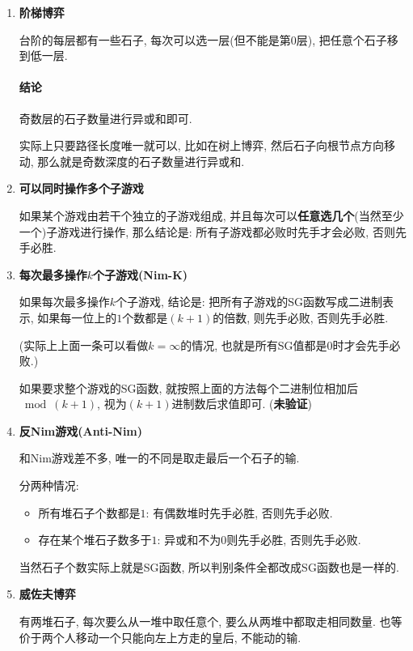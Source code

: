 \begin{enumerate}

\item \textbf{阶梯博弈}

台阶的每层都有一些石子, 每次可以选一层(但不能是第$0$层), 把任意个石子移到低一层.

\paragraph{结论}奇数层的石子数量进行异或和即可.

实际上只要路径长度唯一就可以, 比如在树上博弈, 然后石子向根节点方向移动, 那么就是奇数深度的石子数量进行异或和.

\item \textbf{可以同时操作多个子游戏}

如果某个游戏由若干个独立的子游戏组成, 并且每次可以\textbf{任意选几个}(当然至少一个)子游戏进行操作, 那么结论是: 所有子游戏都必败时先手才会必败, 否则先手必胜.

\item \textbf{每次最多操作$k$个子游戏(Nim-K)}

如果每次最多操作$k$个子游戏, 结论是: 把所有子游戏的SG函数写成二进制表示, 如果每一位上的$1$个数都是$(k+1)$的倍数, 则先手必败, 否则先手必胜.

(实际上上面一条可以看做$k=\infty$的情况, 也就是所有SG值都是$0$时才会先手必败.)

如果要求整个游戏的SG函数, 就按照上面的方法每个二进制位相加后$\bmod (k+1)$, 视为$(k+1)$进制数后求值即可. (\textbf{未验证})

\item \textbf{反Nim游戏(Anti-Nim)}

和Nim游戏差不多, 唯一的不同是取走最后一个石子的输.

分两种情况:

\begin{itemize}
	\item 所有堆石子个数都是$1$: 有偶数堆时先手必胜, 否则先手必败.
	\item 存在某个堆石子数多于$1$: 异或和不为$0$则先手必胜, 否则先手必败.
\end{itemize}

当然石子个数实际上就是SG函数, 所以判别条件全都改成SG函数也是一样的.

\item \textbf{威佐夫博弈}

有两堆石子, 每次要么从一堆中取任意个, 要么从两堆中都取走相同数量. 也等价于两个人移动一个只能向左上方走的皇后, 不能动的输.


\end{enumerate}
